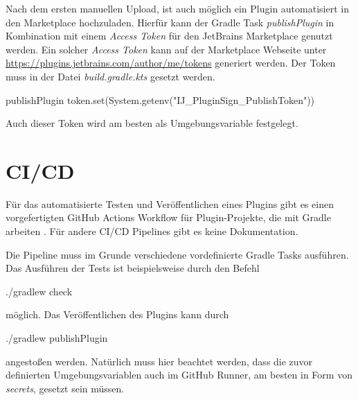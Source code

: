 Nach dem ersten manuellen Upload, ist auch möglich ein
Plugin automatisiert in den Marketplace hochzuladen. Hierfür
kann der Gradle Task \emph{publishPlugin} in Kombination
mit einem \emph{Access Token} für den JetBrains Marketplace genutzt werden.
Ein solcher \emph{Access Token} kann auf der Marketplace Webseite
unter \url{https://plugins.jetbrains.com/author/me/tokens} generiert werden.
Der Token muss in der Datei \emph{build.gradle.kts} gesetzt werden.
\begin{JsCode}[numbers=none]
    publishPlugin {
        token.set(System.getenv("IJ_PluginSign_PublishToken"))
    }
\end{JsCode}
Auch dieser Token wird am besten als Umgebungsvariable festgelegt.


\section{CI/CD}
\label{sec:EntwicklungIntelliJ_CICD}

Für das automatisierte Testen und Veröffentlichen eines Plugins
gibt es einen vorgefertigten GitHub Actions Workflow für 
Plugin-Projekte, die mit Gradle arbeiten \cite{IntelliJGitHubBuildWorkflow}.
Für andere CI/CD Pipelines gibt es keine Dokumentation.

Die Pipeline muss im Grunde verschiedene vordefinierte Gradle Tasks
ausführen. Das Ausführen der Tests ist beispielsweise durch den Befehl
\begin{GenericCode}[numbers=none]
    ./gradlew check
\end{GenericCode}
möglich. Das Veröffentlichen des Plugins kann durch
\begin{GenericCode}[numbers=none]
    ./gradlew publishPlugin 
\end{GenericCode}
angestoßen werden.
Natürlich muss hier beachtet werden, dass die zuvor definierten
Umgebungsvariablen auch im GitHub Runner, 
am besten in Form von \emph{secrets}, gesetzt sein müssen.